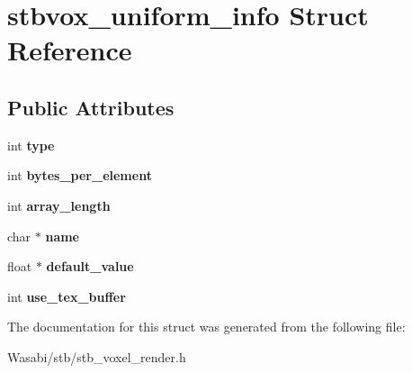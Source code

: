 \hypertarget{structstbvox__uniform__info}{}\section{stbvox\+\_\+uniform\+\_\+info Struct Reference}
\label{structstbvox__uniform__info}
\subsection*{Public Attributes}
\begin{DoxyCompactItemize}
\item 
int {\bfseries type}\hypertarget{structstbvox__uniform__info_ace674a6910945f28faeef4ffe114ebfb}{}\label{structstbvox__uniform__info_ace674a6910945f28faeef4ffe114ebfb}

\item 
int {\bfseries bytes\+\_\+per\+\_\+element}\hypertarget{structstbvox__uniform__info_a4c242fbcda577b5f2b21d8ed26d77db9}{}\label{structstbvox__uniform__info_a4c242fbcda577b5f2b21d8ed26d77db9}

\item 
int {\bfseries array\+\_\+length}\hypertarget{structstbvox__uniform__info_a093aaf2d07ab612f0141de982090b9d4}{}\label{structstbvox__uniform__info_a093aaf2d07ab612f0141de982090b9d4}

\item 
char $\ast$ {\bfseries name}\hypertarget{structstbvox__uniform__info_a2415f4b735714de2a830c47b825755d2}{}\label{structstbvox__uniform__info_a2415f4b735714de2a830c47b825755d2}

\item 
float $\ast$ {\bfseries default\+\_\+value}\hypertarget{structstbvox__uniform__info_ae02f04f9ac3d7412ed5f078356e8d1da}{}\label{structstbvox__uniform__info_ae02f04f9ac3d7412ed5f078356e8d1da}

\item 
int {\bfseries use\+\_\+tex\+\_\+buffer}\hypertarget{structstbvox__uniform__info_af0c0cf215b3f902be206a7fb06eab275}{}\label{structstbvox__uniform__info_af0c0cf215b3f902be206a7fb06eab275}

\end{DoxyCompactItemize}


The documentation for this struct was generated from the following file\+:\begin{DoxyCompactItemize}
\item 
Wasabi/stb/stb\+\_\+voxel\+\_\+render.\+h\end{DoxyCompactItemize}
